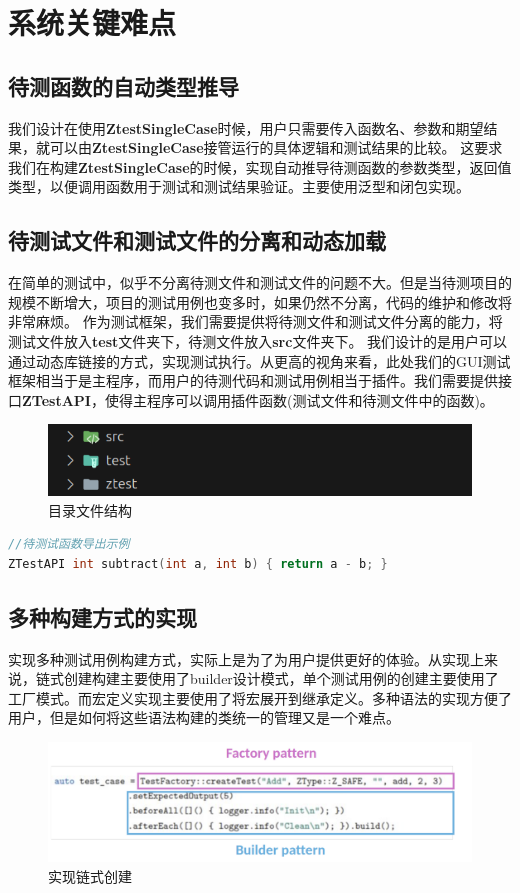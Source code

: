 \documentclass[chinese]{article}
\begin{document}
\section{系统关键难点}
\subsection{待测函数的自动类型推导}
我们设计在使用\textbf{ZtestSingleCase}时候，用户只需要传入函数名、参数和期望结果，就可以由\textbf{ZtestSingleCase}接管运行的具体逻辑和测试结果的比较。
这要求我们在构建\textbf{ZtestSingleCase}的时候，实现自动推导待测函数的参数类型，返回值类型，以便调用函数用于测试和测试结果验证。主要使用泛型和闭包实现。
\subsection{待测试文件和测试文件的分离和动态加载}
在简单的测试中，似乎不分离待测文件和测试文件的问题不大。但是当待测项目的规模不断增大，项目的测试用例也变多时，如果仍然不分离，代码的维护和修改将非常麻烦。
作为测试框架，我们需要提供将待测文件和测试文件分离的能力，将测试文件放入\textbf{test}文件夹下，待测文件放入\textbf{src}文件夹下。
我们设计的是用户可以通过动态库链接的方式，实现测试执行。从更高的视角来看，此处我们的GUI测试框架相当于是主程序，而用户的待测代码和测试用例相当于插件。我们需要提供接口\textbf{ZTestAPI}，使得主程序可以调用插件函数(测试文件和待测文件中的函数)。
\begin{figure}[H]
    \centering
    \includegraphics[width=\textwidth]{img/file.png} %
    \caption{ 目录文件结构}
    \label{fig:diagram}
\end{figure}
\begin{lstlisting}[language=C++]
//待测试函数导出示例
ZTestAPI int subtract(int a, int b) { return a - b; }
\end{lstlisting}
\subsection{多种构建方式的实现}
实现多种测试用例构建方式，实际上是为了为用户提供更好的体验。从实现上来说，链式创建构建主要使用了builder设计模式，单个测试用例的创建主要使用了工厂模式。而宏定义实现主要使用了将宏展开到继承定义。多种语法的实现方便了用户，但是如何将这些语法构建的类统一的管理又是一个难点。
\begin{figure}[H]
    \centering
    \includegraphics[width=\textwidth]{img/build.png} %
    \caption{ 实现链式创建}
    \label{fig:diagram}
\end{figure}
\end{document}
